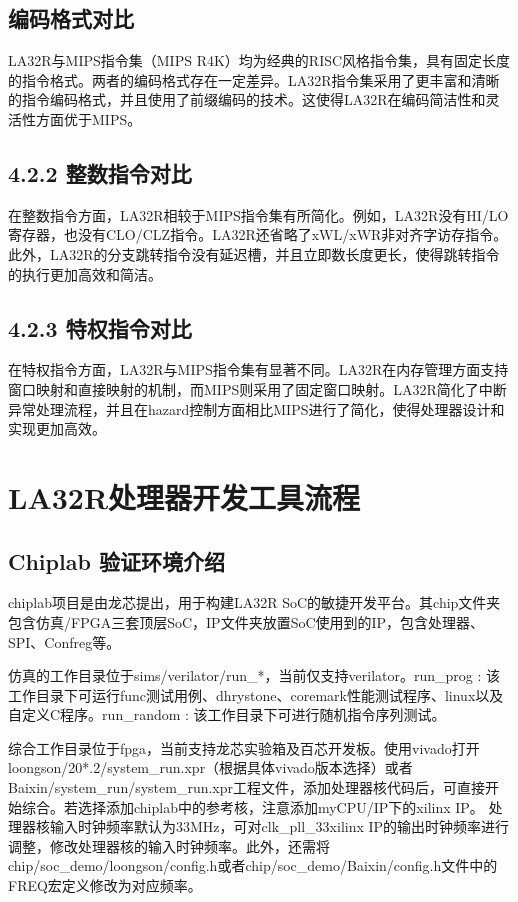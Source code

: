 \subsection{编码格式对比}\label{sec:04-toolchain-007}

LA32R与MIPS指令集（MIPS R4K）均为经典的RISC风格指令集，具有固定长度的指令格式。两者的编码格式存在一定差异。LA32R指令集采用了更丰富和清晰的指令编码格式，并且使用了前缀编码的技术。这使得LA32R在编码简洁性和灵活性方面优于MIPS。

\subsection{4.2.2 整数指令对比}\label{sec:04-toolchain-008}

在整数指令方面，LA32R相较于MIPS指令集有所简化。例如，LA32R没有HI/LO寄存器，也没有CLO/CLZ指令。LA32R还省略了xWL/xWR非对齐字访存指令。此外，LA32R的分支跳转指令没有延迟槽，并且立即数长度更长，使得跳转指令的执行更加高效和简洁。

\subsection{4.2.3 特权指令对比}\label{sec:04-toolchain-009}

在特权指令方面，LA32R与MIPS指令集有显著不同。LA32R在内存管理方面支持窗口映射和直接映射的机制，而MIPS则采用了固定窗口映射。LA32R简化了中断异常处理流程，并且在hazard控制方面相比MIPS进行了简化，使得处理器设计和实现更加高效。

\section{LA32R处理器开发工具流程}\label{sec:04-toolchain-010}

\subsection{Chiplab 验证环境介绍}\label{sec:04-toolchain-011}

chiplab项目是由龙芯提出，用于构建LA32R SoC的敏捷开发平台。其chip文件夹包含仿真/FPGA三套顶层SoC，IP文件夹放置SoC使用到的IP，包含处理器、SPI、Confreg等。

仿真的工作目录位于sims/verilator/run\_*，当前仅支持verilator。run\_prog : 该工作目录下可运行func测试用例、dhrystone、coremark性能测试程序、linux以及自定义C程序。run\_random : 该工作目录下可进行随机指令序列测试。

综合工作目录位于fpga，当前支持龙芯实验箱及百芯开发板。使用vivado打开loongson/20*.2/system\_run.xpr（根据具体vivado版本选择）或者Baixin/system\_run/system\_run.xpr工程文件，添加处理器核代码后，可直接开始综合。若选择添加chiplab中的参考核，注意添加myCPU/IP下的xilinx IP。
处理器核输入时钟频率默认为33MHz，可对clk\_pll\_33xilinx IP的输出时钟频率进行调整，修改处理器核的输入时钟频率。此外，还需将chip/soc\_demo/loongson/config.h或者chip/soc\_demo/Baixin/config.h文件中的FREQ宏定义修改为对应频率。

